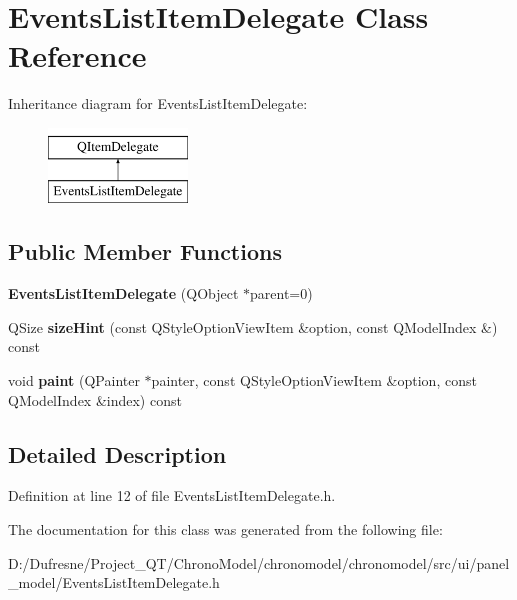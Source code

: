 \hypertarget{class_events_list_item_delegate}{\section{Events\-List\-Item\-Delegate Class Reference}
\label{class_events_list_item_delegate}
}
Inheritance diagram for Events\-List\-Item\-Delegate\-:\begin{figure}[H]
\begin{center}
\leavevmode
\includegraphics[height=2.000000cm]{class_events_list_item_delegate}
\end{center}
\end{figure}
\subsection*{Public Member Functions}
\begin{DoxyCompactItemize}
\item 
\hypertarget{class_events_list_item_delegate_aa5680723cac696270efd9ee8130221b2}{{\bfseries Events\-List\-Item\-Delegate} (Q\-Object $\ast$parent=0)}\label{class_events_list_item_delegate_aa5680723cac696270efd9ee8130221b2}

\item 
\hypertarget{class_events_list_item_delegate_a7fa9072d53141a4b42e7470149fde8c7}{Q\-Size {\bfseries size\-Hint} (const Q\-Style\-Option\-View\-Item \&option, const Q\-Model\-Index \&) const }\label{class_events_list_item_delegate_a7fa9072d53141a4b42e7470149fde8c7}

\item 
\hypertarget{class_events_list_item_delegate_aa21fb1f65849accbc246330bd185e2db}{void {\bfseries paint} (Q\-Painter $\ast$painter, const Q\-Style\-Option\-View\-Item \&option, const Q\-Model\-Index \&index) const }\label{class_events_list_item_delegate_aa21fb1f65849accbc246330bd185e2db}

\end{DoxyCompactItemize}


\subsection{Detailed Description}


Definition at line 12 of file Events\-List\-Item\-Delegate.\-h.



The documentation for this class was generated from the following file\-:\begin{DoxyCompactItemize}
\item 
D\-:/\-Dufresne/\-Project\-\_\-\-Q\-T/\-Chrono\-Model/chronomodel/chronomodel/src/ui/panel\-\_\-model/Events\-List\-Item\-Delegate.\-h\end{DoxyCompactItemize}
